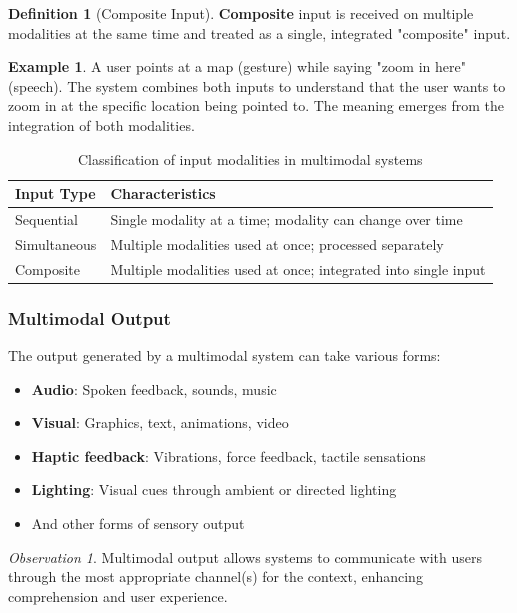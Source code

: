 \documentclass[11pt,a4paper]{article}
\theoremstyle{definition}
\newtheorem{definition}{Definition}[section]
\newtheorem{example}{Example}[section]
\theoremstyle{plain}
\theoremstyle{remark}
\newtheorem*{observation}{Observation}
\begin{document}
\begin{definition}[Composite Input]
\textbf{Composite} input is received on multiple modalities at the same time and treated as a single, integrated "composite" input.
\end{definition}

\begin{example}
A user points at a map (gesture) while saying "zoom in here" (speech). The system combines both inputs to understand that the user wants to zoom in at the specific location being pointed to. The meaning emerges from the integration of both modalities.
\end{example}

\begin{table}[h]
\centering
\begin{tabular}{|l|p{10cm}|}
\hline
\textbf{Input Type} & \textbf{Characteristics} \\
\hline
Sequential & Single modality at a time; modality can change over time \\
\hline
Simultaneous & Multiple modalities used at once; processed separately \\
\hline
Composite & Multiple modalities used at once; integrated into single input \\
\hline
\end{tabular}
\caption{Classification of input modalities in multimodal systems}
\end{table}

\subsubsection{Multimodal Output}

The output generated by a multimodal system can take various forms:

\begin{itemize}
    \item \textbf{Audio}: Spoken feedback, sounds, music
    \item \textbf{Visual}: Graphics, text, animations, video
    \item \textbf{Haptic feedback}: Vibrations, force feedback, tactile sensations
    \item \textbf{Lighting}: Visual cues through ambient or directed lighting
    \item And other forms of sensory output
\end{itemize}

\begin{observation}
Multimodal output allows systems to communicate with users through the most appropriate channel(s) for the context, enhancing comprehension and user experience.
\end{observation}
\end{document}
